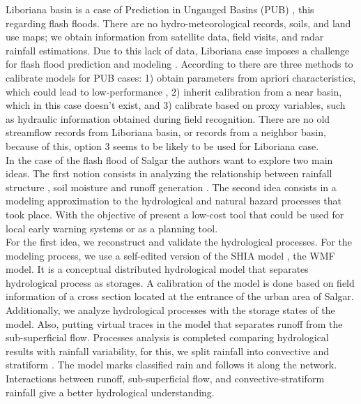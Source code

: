 {Liboriana basin is a case of Prediction in Ungauged Basins (PUB) \cite{Sivapalan2013, Seibert2009, Beven2007, Bonell2006}, this regarding flash floods.  There are no hydro-meteorological records, soils, and land use maps; we obtain information from satellite data, field visits, and radar rainfall estimations.  Due to this lack of data, Liboriana case imposes a challenge for flash flood prediction and modeling \citep{Sivapalan2013,Yamanaka2017}.  According to \citet{blschl2012} there are three methods to calibrate models for PUB cases: 1) obtain parameters from apriori characteristics, which could lead to low-performance \citep{Duan2006}, 2) inherit calibration from a near basin, which in this case doesn't exist, and 3) calibrate based on proxy variables, such as hydraulic information obtained during field recognition.  There are no old streamflow records from Liboriana basin, or records from a neighbor basin, because of this, option 3 seems to be likely to be used for Liboriana case.\\

In the case of the flash flood of Salgar the authors want to explore two main ideas. The first notion consists in analyzing the relationship between rainfall structure \citep{Llasat2016,Fragoso2012}, soil moisture and runoff generation \citep{Penna2011,Tramblay2012b,Garambois2013}.  The second idea consists in a modeling approximation to the hydrological and natural hazard processes that took place. With the objective of present a low-cost tool that could be used for local early warning systems or as a planning tool.\\   

For the first idea, we reconstruct and validate the hydrological processes.  For the modeling process, we use a self-edited version of the SHIA model \citep{Frances2007b}, the WMF model. It is a conceptual distributed hydrological model that separates hydrological process as storages.  A calibration of the model is done based on field information of a cross section located at the entrance of the urban area of Salgar. Additionally, we analyze hydrological processes with the storage states of the model. Also, putting virtual traces in the model that separates runoff from the sub-superficial flow.  Processes analysis is completed comparing hydrological results with rainfall variability, for this, we split rainfall into convective and stratiform \citep{Houze2015,Steiner1995}. The model marks classified rain and follows it along the network.  Interactions between runoff, sub-superficial flow, and convective-stratiform rainfall give a better hydrological understanding.\\

}
